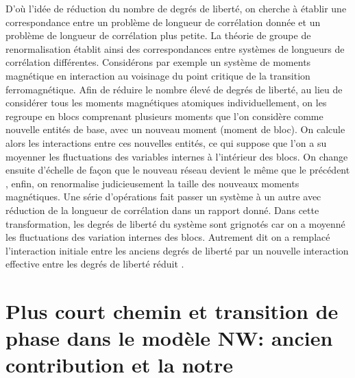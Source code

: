 D'où l'idée de réduction du nombre de degrés de liberté, on cherche à établir une correspondance entre un problème de longueur de corrélation donnée et un problème de longueur de corrélation plus petite. La théorie de groupe de renormalisation établit ainsi des correspondances entre systèmes de longueurs de corrélation différentes. Considérons par exemple un système de moments magnétique en interaction au voisinage du point critique de la transition ferromagnétique. Afin de réduire le nombre élevé de degrés de liberté, au lieu de considérer tous les moments magnétiques atomiques individuellement, on les regroupe en blocs comprenant plusieurs moments que l'on considère comme nouvelle entités de base, avec un nouveau moment (moment de bloc). On calcule alors les interactions entre ces nouvelles entités, ce qui suppose que l'on a su moyenner les fluctuations des variables internes à l'intérieur des blocs. On change ensuite d'échelle de façon que le nouveau réseau devient le même que le précédent , enfin, on renormalise judicieusement la taille des nouveaux moments magnétiques. Une série d'opérations fait passer un système à un autre avec réduction de la longueur de corrélation dans un rapport donné. Dans cette transformation, les degrés de liberté du système sont grignotés car on a moyenné les fluctuations des variation internes des blocs. Autrement dit on a remplacé l'interaction initiale entre les anciens degrés de liberté par un nouvelle interaction effective entre les degrés de liberté réduit \cite{Pelissetto-Vicari2002,Wilson1975}.

\section{Plus court chemin et transition de phase dans le modèle NW: ancien contribution et la notre}
